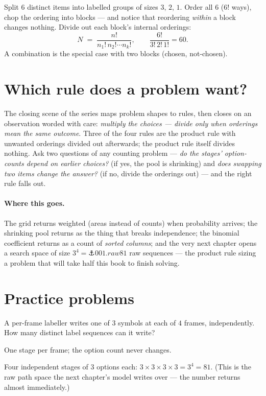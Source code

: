 \begin{narrative}
Split $6$ distinct items into labelled groups of sizes $3$, $2$, $1$.
Order all $6$ ($6!$ ways), chop the ordering into blocks — and notice that
reordering \emph{within} a block changes nothing. Divide out each block's
internal orderings:
\[
  N \;=\; \frac{n!}{n_1!\, n_2! \cdots n_k!},
  \qquad
  \frac{6!}{3!\,2!\,1!} = 60 .
\]
A combination is the special case with two blocks (chosen, not-chosen).

\section{Which rule does a problem want?}

The closing scene of the series maps problem shapes to rules, then closes
on an observation worded with care: \emph{multiply the choices — divide
only when orderings mean the same outcome}. Three of the four rules are
the product rule with unwanted orderings divided out afterwards; the
product rule itself divides nothing. Ask two questions of any
counting problem — \emph{do the stages' option-counts depend on earlier
choices?} (if yes, the pool is shrinking) and \emph{does swapping two
items change the answer?} (if no, divide the orderings out) — and the
right rule falls out.

\paragraph{Where this goes.} The grid returns weighted (areas instead of
counts) when probability arrives; the shrinking pool returns as the thing
that breaks independence; the binomial coefficient returns as a count of
\emph{sorted columns}; and the very next chapter opens a search space of
size $3^4 = \anchor{001.raw81}$ raw sequences — the product rule sizing a
problem that will take half this book to finish solving.
\end{narrative}

\section*{Practice problems}

\begin{problem}
A per-frame labeller writes one of $3$ symbols at each of $4$ frames,
independently. How many distinct label sequences can it write?
\begin{hint}
One stage per frame; the option count never changes.
\end{hint}
\begin{solution}
Four independent stages of $3$ options each:
$3 \times 3 \times 3 \times 3 = 3^4 = 81$. (This is the raw path space
the next chapter's model writes over — the number returns almost
immediately.)
\end{solution}
\end{problem}

